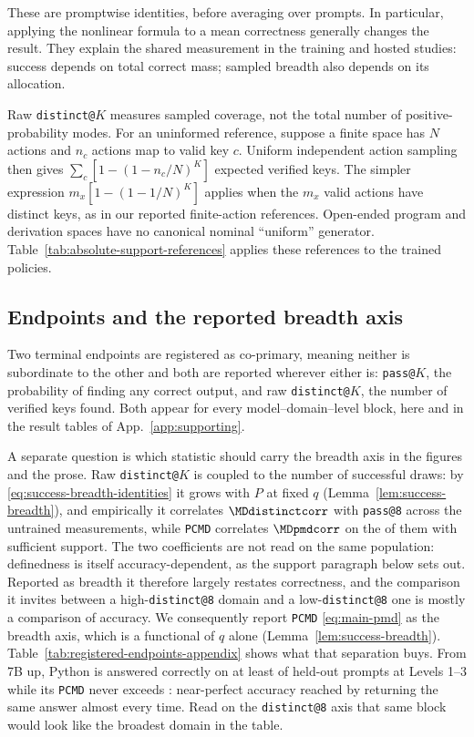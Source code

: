 \documentclass{article}
\newcommand{\1}{\mathbf 1}
\newcommand{\pmd}{\texttt{PCMD}}
\theoremstyle{remark}
\theoremstyle{definition}
\theoremstyle{plain}
\begin{document}
These are promptwise identities, before averaging over prompts. In particular,
applying the nonlinear formula to a mean correctness generally changes the
result. They explain the shared measurement in the training and hosted
studies: success depends on total correct mass; sampled breadth also depends
on its allocation.

Raw \texttt{distinct@}$K$ measures sampled coverage, not the total number of
positive-probability modes. For an uninformed reference, suppose a finite
space has $N$ actions and $n_c$ actions map to valid key $c$. Uniform independent
action sampling then gives $\sum_c[1-(1-n_c/N)^K]$ expected verified keys.
The simpler expression $m_x[1-(1-1/N)^K]$ applies when the $m_x$ valid actions
have distinct keys, as in our reported finite-action references.
Open-ended program and derivation spaces have no canonical nominal
``uniform'' generator. Table~\ref{tab:absolute-support-references} applies these
references to the trained policies.

\subsection{Endpoints and the reported breadth axis}
\label{app:registered-endpoints}

Two terminal endpoints are registered as co-primary, meaning neither is
subordinate to the other and both are reported wherever either is:
\texttt{pass@}$K$, the probability of finding any correct output, and raw
\texttt{distinct@}$K$, the number of verified keys found. Both appear for every
model--domain--level block, here and in the result tables of
App.~\ref{app:supporting}.

A separate question is which statistic should carry the breadth axis in the
figures and the prose. Raw \texttt{distinct@}$K$ is coupled to the number of successful
draws: by \eqref{eq:success-breadth-identities} it grows with $P$ at fixed $q$
(Lemma~\ref{lem:success-breadth}), and
empirically it correlates $\MDdistinctcorr$ with \texttt{pass@8} across the
\MDcells{} untrained measurements, while \pmd{} correlates $\MDpmdcorr$ on the
\MDreportable{} of them with sufficient support. The two coefficients are not
read on the same population: definedness is itself accuracy-dependent, as the
support paragraph below sets out.
Reported as breadth it therefore largely restates correctness, and the
comparison it invites between a high-\texttt{distinct@8} domain and a
low-\texttt{distinct@8} one is mostly a comparison of accuracy. We consequently
report \pmd{} \eqref{eq:main-pmd} as the breadth axis, which is a functional of
$q$ alone (Lemma~\ref{lem:success-breadth}).
Table~\ref{tab:registered-endpoints-appendix} shows what that separation buys.
From 7B up, Python is answered correctly on at least \MDpyPasslo{} of held-out
prompts at Levels 1--3 while its \pmd{} never exceeds \MDpyPmdhi{}:
near-perfect accuracy reached by returning the same answer almost every time.
Read on the \texttt{distinct@8} axis that same block would look like the
broadest domain in the table.
\end{document}
